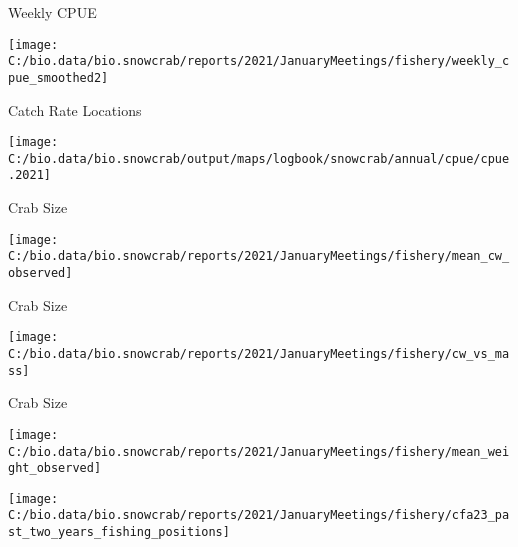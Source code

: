 \documentclass[
  ignorenonframetext,
]{beamer}
\begin{document}
\begin{frame}{Weekly CPUE}
\protect\hypertarget{weekly-cpue}{}
\begin{center}\texttt{[image: C:/bio.data/bio.snowcrab/reports/2021/JanuaryMeetings/fishery/weekly\_cpue\_smoothed2]} \end{center}
\end{frame}

\begin{frame}{Catch Rate Locations}
\protect\hypertarget{catch-rate-locations}{}
\begin{center}\texttt{[image: C:/bio.data/bio.snowcrab/output/maps/logbook/snowcrab/annual/cpue/cpue.2021]} \end{center}
\end{frame}

\begin{frame}{Crab Size}
\protect\hypertarget{crab-size}{}
\begin{center}\texttt{[image: C:/bio.data/bio.snowcrab/reports/2021/JanuaryMeetings/fishery/mean\_cw\_observed]} \end{center}
\end{frame}

\begin{frame}{Crab Size}
\protect\hypertarget{crab-size-1}{}
\begin{center}\texttt{[image: C:/bio.data/bio.snowcrab/reports/2021/JanuaryMeetings/fishery/cw\_vs\_mass]} \end{center}
\end{frame}

\begin{frame}{Crab Size}
\protect\hypertarget{crab-size-2}{}
\begin{center}\texttt{[image: C:/bio.data/bio.snowcrab/reports/2021/JanuaryMeetings/fishery/mean\_weight\_observed]} \end{center}
\end{frame}

\begin{frame}
\begin{center}\texttt{[image: C:/bio.data/bio.snowcrab/reports/2021/JanuaryMeetings/fishery/cfa23\_past\_two\_years\_fishing\_positions]} \end{center}
\end{frame}
\end{document}
